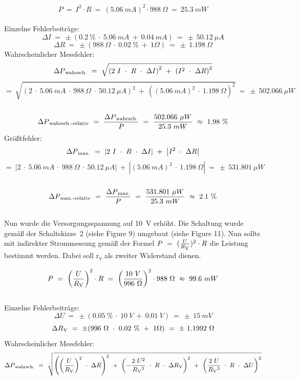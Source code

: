 \documentclass[a4paper,12pt]{article}
\begin{document}
\[
P ~=~ I^2 \cdot R ~=~ (5.06~mA)^2 \cdot 988~\Omega ~=~ 25.3~mW
\]\\
Einzelne Fehlerbeiträge:
\[
\Delta I~=~\pm(0.2~\%~\cdot~5.06~mA~+~0.04~mA)~=~\pm~50.12~\mu A
\]
\[
\Delta R~=~\pm(988~\Omega~\cdot~0.02~\%~+~1\Omega)~=~\pm~1.198~\Omega
\]
Wahrscheinlicher Messfehler:\\
\[
\Delta P\textsubscript{wahrsch.}~=~\sqrt{\left(2~I~\cdot~R~\cdot~\Delta I\right)^2~+~\left(I^2~\cdot~\Delta R\right)^2}
\]
\[
=~\sqrt{\left(2~\cdot~5.06~mA~\cdot~988~\Omega~\cdot~50.12~\mu A\right)^2~+~\left((5.06~mA)^2~\cdot~1.198~\Omega\right)^2}~=~\pm~502.066~\mu W
\]\\
\[
\Delta P\textsubscript{wahrsch.-relativ}~=~\frac{\Delta P\textsubscript{wahrsch.}}{P}~=~\frac{502.066~\mu W}{25.3~mW}~\approx~1.98~\%
\]
Größtfehler:\\
\[
\Delta P\textsubscript{max.}~=~\left\lvert 2~I~\cdot~R~\cdot~\Delta I\right\rvert~+~\left\lvert I^2~\cdot~\Delta R\right\rvert
\]
\[
=~\left\lvert 2~\cdot~5.06~mA~\cdot~988~\Omega~\cdot~50.12~\mu A\right\rvert~+~\left\lvert (5.06~mA)^2~\cdot~1.198~\Omega\right\rvert~=~\pm~531.801~\mu W
\]\\
\[
\Delta P\textsubscript{max.-relativ}~=~\frac{\Delta P\textsubscript{max.}}{P}~=~\frac{531.801~\mu W}{25.3~mW}~\approx~2.1~\%
\]\\


\noindent Nun wurde die Versorgungsspannung auf 10~V erhöht. Die Schaltung wurde gemäß der Schaltskizze~2 (siehe Figure 9) umgebaut (siehe Figure 11). Nun sollte mit indirekter Strommessung gemäß der Formel \(P ~=~  (\frac{U}{R\textsubscript{V}})^2 \cdot R\) die Leistung bestimmt werden. Dabei soll r\textsubscript{v} als zweiter Widerstand dienen.

\[
P ~=~  \left(\frac{U}{R\textsubscript{V}}\right)^2 \cdot R ~=~ \left(\frac{10~V}{996~\Omega}\right)^2 \cdot 988~\Omega ~\approx~ 99.6~mW
\]\\

\noindent Einzelne Fehlerbeiträge:
\[
\Delta U~=~\pm(0.05~\%~\cdot~10~V~+~0.01~V)~=~\pm~15~mV
\]
\[
\Delta R\textsubscript{V}~=~\pm(996~\Omega~\cdot~0.02~\%~+~1\Omega)~=~\pm~1.1992~\Omega
\]
Wahrscheinlicher Messfehler:\\
\[
\Delta P\textsubscript{wahrsch.}~=~\sqrt{\left(\left(\frac{U}{R\textsubscript{V}}\right)^2~\cdot~\Delta R\right)^2~+~\left(-\frac{2~U^2}{R\textsubscript{V}^3}~\cdot~R~\cdot~\Delta R\textsubscript{V} \right)^2~+~\left(\frac{2~U}{R\textsubscript{V}^3}~\cdot~R~\cdot~\Delta U\right)^2}
\]
\end{document}
